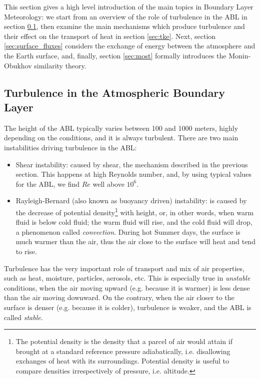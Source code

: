 \documentclass[a4paper,11pt]{kth-mag}
\begin{document}
This section gives a high level introduction of the main topics in Boundary Layer Meteorology: we start from an overview of the role of turbulence in the ABL in section \ref{sec:abl_turbulence}, then examine the main mechanisms which produce turbulence and their effect on the transport of heat in section \ref{sec:tke}. Next, section \ref{sec:surface_fluxes} considers the exchange of energy between the atmosphere and the Earth surface, and, finally, section \ref{sec:most} formally introduces the Monin-Obukhov similarity theory.

\subsection{Turbulence in the Atmospheric Boundary Layer}
\label{sec:abl_turbulence}
The height of the ABL typically varies between 100 and 1000 meters, highly depending on the conditions, and it is always turbulent. There are two main instabilities driving turbulence in the ABL:

\begin{itemize}
\item Shear instability: caused by shear, the mechanism described in the previous section. This happens at high Reynolds number, and, by using typical values for the ABL, we find $Re$ well above $10^6$.
\item Rayleigh-Bernard (also known as buoyancy driven) instability: is caused by the decrease of potential density\footnote{The potential density is the density that a parcel of air would attain if brought at a standard reference pressure adiabatically, i.e. disallowing exchanges of heat with its surroundings. Potential density is useful to compare densities irrespectively of pressure, i.e. altitude.} with height, or, in other words, when warm fluid is below cold fluid; the warm fluid will rise, and the cold fluid will drop, a phenomenon called \emph{convection}. During hot Summer days, the surface is much warmer than the air, thus the air close to the surface will heat and tend to rise.
\end{itemize}

Turbulence has the very important role of transport and mix of air properties, such as heat, moisture, particles, aerosols, etc. This is especially true in \emph{unstable} conditions, when the air moving upward (e.g. because it is warmer) is less dense than the air moving downward. On the contrary, when the air closer to the surface is denser (e.g. because it is colder), turbulence is weaker, and the ABL is called \emph{stable}.
\end{document}
